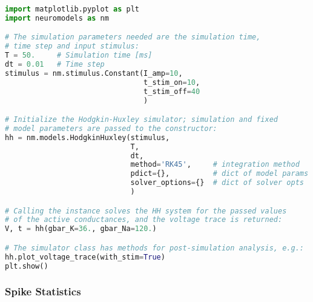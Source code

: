 \begin{lstlisting}[language=python, label={lst:hh_simulator}, caption={Example usage of the HH simulator.}]
import matplotlib.pyplot as plt
import neuromodels as nm

# The simulation parameters needed are the simulation time,
# time step and input stimulus:
T = 50.     # Simulation time [ms]
dt = 0.01   # Time step
stimulus = nm.stimulus.Constant(I_amp=10,
                                t_stim_on=10,
                                t_stim_off=40
                                )

# Initialize the Hodgkin-Huxley simulator; simulation and fixed
# model parameters are passed to the constructor:
hh = nm.models.HodgkinHuxley(stimulus,
                             T,
                             dt,
                             method='RK45',     # integration method
                             pdict={},          # dict of model params
                             solver_options={}  # dict of solver opts
                             )

# Calling the instance solves the HH system for the passed values
# of the active conductances, and the voltage trace is returned:
V, t = hh(gbar_K=36., gbar_Na=120.)

# The simulator class has methods for post-simulation analysis, e.g.:
hh.plot_voltage_trace(with_stim=True)
plt.show()
\end{lstlisting}

\subsubsection*{Spike Statistics}

